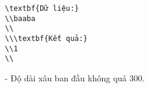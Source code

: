 \begin{verbatim}
\textbf{Dữ liệu:}
\\baaba
\\
\\\textbf{Kết quả:}
\\1
\\\end{verbatim}
- Độ dài xâu ban đầu không quá 300.